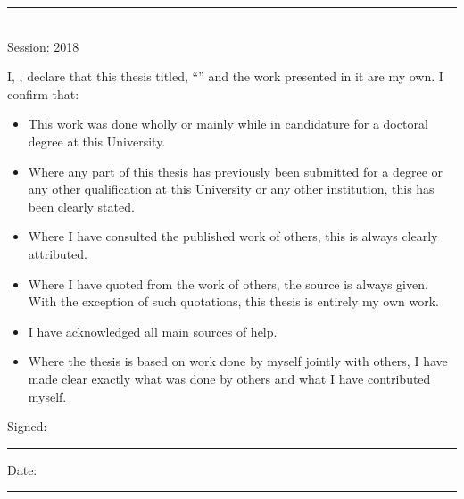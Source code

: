 \documentclass[b5paper, 12pt, openright]{book} %
\begin{document}
{\begin{titlepage}
\begin{small}
{{				

			}}
		\bigskip\bigskip\bigskip\bigskip
		\begin{center}
			\rule{3cm}{1pt}\\
			Session: 2018\\
		\end{center}
	\end{small}
\end{titlepage}

\addtocounter{page}{-1}

\newpage


\makeatletter
\noindent I, \@author, declare that this thesis titled, \enquote{\@title} and the work presented in it are my own. I confirm that:
\makeatother

\begin{itemize}
	\item This work was done wholly or mainly while in candidature for a doctoral degree at this University.
	\item Where any part of this thesis has previously been submitted for a degree or any other qualification at this University or any other institution, this has been clearly stated.
	\item Where I have consulted the published work of others, this is always clearly attributed.
	\item Where I have quoted from the work of others, the source is always given. With the exception of such quotations, this thesis is entirely my own work.
	\item I have acknowledged all main sources of help.
	\item Where the thesis is based on work done by myself jointly with others, I have made clear exactly what was done by others and what I have contributed myself.
\end{itemize}

\bigskip\bigskip

\noindent Signed:\\
\rule[0.5em]{25em}{0.5pt} %

\bigskip

\noindent Date:\\
\rule[0.5em]{25em}{0.5pt} %

}
\end{document}
